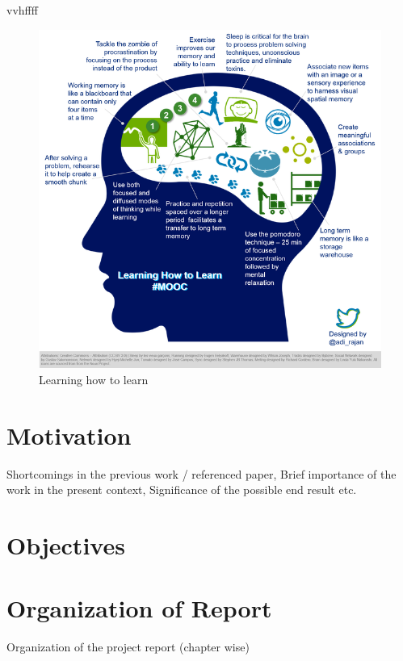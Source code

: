 \begin{definition}
vvhffff
\end{definition}

\begin{figure}[bpht]
\includegraphics{Chapter1/LHTL}
\caption{Learning how to learn}
\end{figure}

\section{Motivation}
Shortcomings in the previous work / referenced paper,  Brief importance of the work in the present context,  Significance of the possible end result etc.

\section{Objectives}

\section{Organization of Report}

Organization of the project report (chapter wise)






